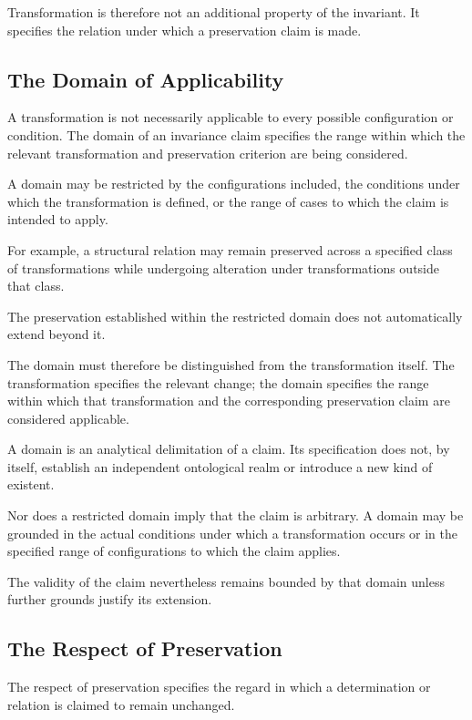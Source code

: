 Transformation is therefore not an additional
property of the invariant. It specifies
the relation under which a preservation
claim is made.

\subsection{The Domain of Applicability}

A transformation is not necessarily applicable
to every possible configuration or condition.
The domain of an invariance claim specifies
the range within which the relevant
transformation and preservation criterion
are being considered.

A domain may be restricted by the configurations
included, the conditions under which the
transformation is defined, or the range
of cases to which the claim is intended
to apply.

For example, a structural relation may
remain preserved across a specified class
of transformations while undergoing
alteration under transformations outside
that class.

The preservation established within the
restricted domain does not automatically
extend beyond it.

The domain must therefore be distinguished
from the transformation itself. The
transformation specifies the relevant
change; the domain specifies the range
within which that transformation and
the corresponding preservation claim
are considered applicable.

A domain is an analytical delimitation
of a claim. Its specification does not,
by itself, establish an independent
ontological realm or introduce a new
kind of existent.

Nor does a restricted domain imply that
the claim is arbitrary. A domain may be
grounded in the actual conditions under
which a transformation occurs or in the
specified range of configurations to
which the claim applies.

The validity of the claim nevertheless
remains bounded by that domain unless
further grounds justify its extension.

\subsection{The Respect of Preservation}

The respect of preservation specifies
the regard in which a determination
or relation is claimed to remain unchanged.

